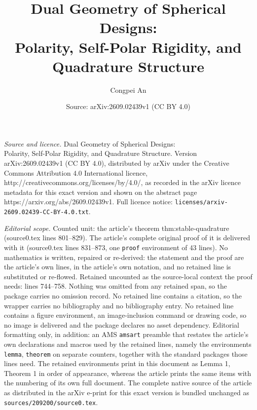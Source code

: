 \documentclass[10pt,a4paper]{amsart}
\title{Dual Geometry of Spherical Designs:\\ Polarity, Self-Polar Rigidity, and Quadrature Structure}
\author{Congpei An}
\date{Source: arXiv:2609.02439v1 (CC BY 4.0)}
\begin{document}
\maketitle

\noindent\emph{Source and licence.} Dual Geometry of Spherical Designs:\\ Polarity, Self-Polar Rigidity, and Quadrature Structure. Version arXiv:2609.02439v1 (CC BY 4.0), distributed by arXiv under the Creative Commons Attribution 4.0 International licence, http://creativecommons.org/licenses/by/4.0/, as recorded in the arXiv licence metadata for this exact version and shown on the abstract page https://arxiv.org/abs/2609.02439v1. Full licence notice: \texttt{licenses/arxiv-2609.02439-CC-BY-4.0.txt}.\par\smallskip

\noindent\textit{Editorial scope.} Counted unit: the article's theorem thm:stable-quadrature (source0.tex lines 801--829). The article's complete original proof of it is delivered with it (source0.tex lines 831--873, one \texttt{proof} environment of 43 lines). No mathematics is written, repaired or re-derived: the statement and the proof are the article's own lines, in the article's own notation, and no retained line is substituted or re-flowed.  Retained uncounted as the source-local context the proof needs: lines 744--758.  Nothing was omitted from any retained span, so the package carries no omission record.  No retained line contains a citation, so the wrapper carries no bibliography and no bibliography entry.  No retained line contains a figure environment, an image-inclusion command or drawing code, so no image is delivered and the package declares no asset dependency.  Editorial formatting only, in addition: an AMS \texttt{amsart} preamble that restates the article's own declarations and macros used by the retained lines, namely the environments \texttt{lemma}, \texttt{theorem} on separate counters, together with the standard packages those lines need.  The retained environments print in this document as Lemma 1, Theorem 1 in order of appearance, whereas the article prints the same items with the numbering of its own full document.  The complete native source of the article as distributed in the arXiv e-print for this exact version is bundled unchanged as \texttt{sources/209200/source0.tex}.
\end{document}
